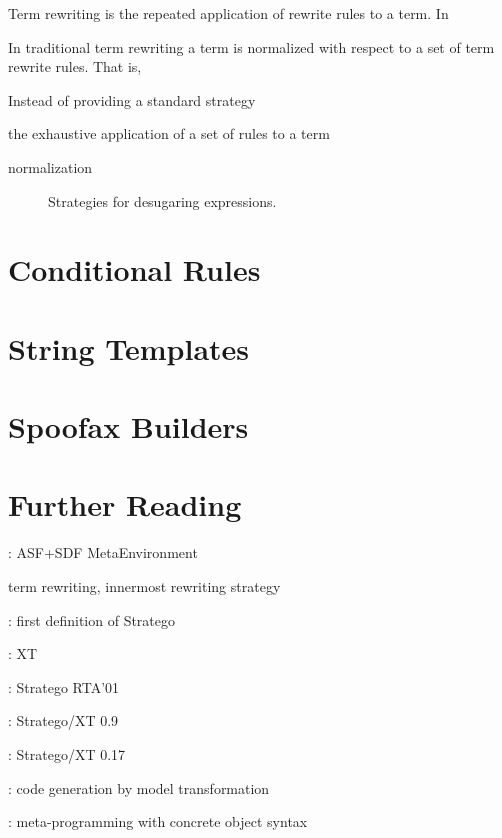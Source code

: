 Term rewriting is the repeated application of rewrite rules to a term.
In 

In traditional term rewriting a term is normalized with respect to a set of term
rewrite rules. That is, 

Instead of providing a standard strategy 

the exhaustive application of a set of rules to a term

normalization

\begin{figure}

\caption{Strategies for desugaring expressions.}
\end{figure}


\section{Conditional Rules}

\section{String Templates}


\section{Spoofax Builders}


\section{Further Reading}

\cite{Klint93,BrandDHJJKKMOSVVV01}: ASF+SDF MetaEnvironment

term rewriting, innermost rewriting strategy

\cite{VisserBT98}: first definition of Stratego

\cite{JongeVV01}: XT

\cite{Visser01}: Stratego RTA'01

\cite{Visser03}: Stratego/XT 0.9

\cite{BravenboerKVV08}: Stratego/XT 0.17

\cite{HemelKGV10}: code generation by model transformation


\cite{Visser02}: meta-programming with concrete object syntax